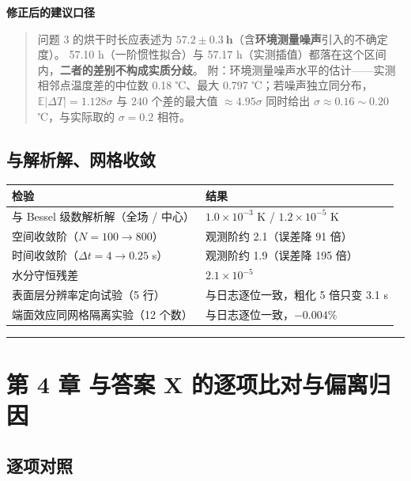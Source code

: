 \textbf{修正后的建议口径}


\begin{quote}
问题 3 的烘干时长应表述为 $\mathbf{57.2\pm0.3\ h}$（含\textbf{环境测量噪声}引入的不确定度）。 57.10 h（一阶惯性拟合）与 57.17 h（实测插值）都落在这个区间内，\textbf{二者的差别不构成实质分歧}。  附：环境测量噪声水平的估计——实测相邻点温度差的中位数 0.18 ℃、最大 0.797 ℃；若噪声独立同分布，$\mathbb E|\Delta T|=1.128\sigma$ 与 $240$ 个差的最大值 $\approx4.95\sigma$ 同时给出 $\sigma\approx0.16\sim0.20$ ℃，与实际取的 $\sigma=0.2$ 相符。
\end{quote}


\subsection{与解析解、网格收敛}


\begin{center}
\small
\begin{tabular}{ll}
\toprule
检验 & 结果 \\
\midrule
与 Bessel 级数解析解（全场 / 中心） & $1.0\times10^{-3}$ K / $1.2\times10^{-5}$ K \\
空间收敛阶（$N=100\to800$） & 观测阶约 2.1（误差降 91 倍） \\
时间收敛阶（$\Delta t=4\to0.25$ s） & 观测阶约 1.9（误差降 195 倍） \\
水分守恒残差 & $2.1\times10^{-5}$ \\
表面层分辨率定向试验（5 行） & 与日志逐位一致，粗化 5 倍只变 3.1 s \\
端面效应同网格隔离实验（12 个数） & 与日志逐位一致，$-0.004\%$ \\
\bottomrule
\end{tabular}
\end{center}


\vspace{1mm}\hrule\vspace{1mm}


\section{第 4 章 与答案 X 的逐项比对与偏离归因}


\subsection{逐项对照}


